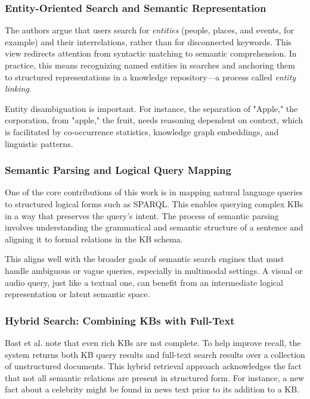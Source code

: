 \documentclass[conference]{IEEEtran}
\begin{document}
\subsubsection{Entity-Oriented Search and Semantic Representation}
The authors argue that users search for \textit{entities} (people, places, and events, for example) and their interrelations, rather than for disconnected keywords. This view redirects attention from syntactic matching to semantic comprehension. In practice, this means recognizing named entities in searches and anchoring them to structured representations in a knowledge repository—a process called \textit{entity linking}.

Entity disambiguation is important. For instance, the separation of "Apple," the corporation, from "apple," the fruit, needs reasoning dependent on context, which is facilitated by co-occurrence statistics, knowledge graph embeddings, and linguistic patterns.


\subsubsection{Semantic Parsing and Logical Query Mapping}
One of the core contributions of this work is in mapping natural language queries to structured logical forms such as SPARQL. This enables querying complex KBs in a way that preserves the query's intent. The process of semantic parsing involves understanding the grammatical and semantic structure of a sentence and aligning it to formal relations in the KB schema.

This aligns well with the broader goals of semantic search engines that must handle ambiguous or vague queries, especially in multimodal settings. A visual or audio query, just like a textual one, can benefit from an intermediate logical representation or latent semantic space.

\subsubsection{Hybrid Search: Combining KBs with Full-Text}
Bast et al. note that even rich KBs are not complete. To help improve recall, the system returns both KB query results and full-text search results over a collection of unstructured documents. This hybrid retrieval approach acknowledges the fact that not all semantic relations are present in structured form. For instance, a new fact about a celebrity might be found in news text prior to its addition to a KB.
\end{document}
